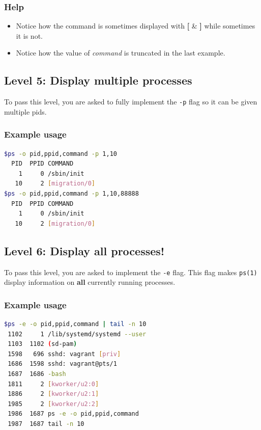 \documentclass[12pt]{article}
\begin{document}
\subsubsection{Help}

\begin{itemize}
	\item Notice how the command is sometimes displayed with \textbf{[} \& \textbf{]} while sometimes it is not.
	\item Notice how the value of \textit{command} is truncated in the last example.
\end{itemize}

\subsection{Level 5: Display multiple processes}

To pass this level, you are asked to fully implement the \texttt{-p} flag so it can be given multiple pids.

\subsubsection{Example usage}

\begin{lstlisting}[language=bash]
$ps -o pid,ppid,command -p 1,10
  PID  PPID COMMAND
    1     0 /sbin/init
   10     2 [migration/0]
$ps -o pid,ppid,command -p 1,10,88888
  PID  PPID COMMAND
    1     0 /sbin/init
   10     2 [migration/0]
\end{lstlisting}

\subsection{Level 6: Display all processes!}

To pass this level, you are asked to implement the \texttt{-e} flag. This flag makes \texttt{ps(1)} display information on \textbf{all} currently running processes.

\subsubsection{Example usage}

\begin{lstlisting}[language=bash]
$ps -e -o pid,ppid,command | tail -n 10
 1102     1 /lib/systemd/systemd --user
 1103  1102 (sd-pam)
 1598   696 sshd: vagrant [priv]
 1686  1598 sshd: vagrant@pts/1
 1687  1686 -bash
 1811     2 [kworker/u2:0]
 1886     2 [kworker/u2:1]
 1985     2 [kworker/u2:2]
 1986  1687 ps -e -o pid,ppid,command
 1987  1687 tail -n 10
\end{lstlisting}
\end{document}
